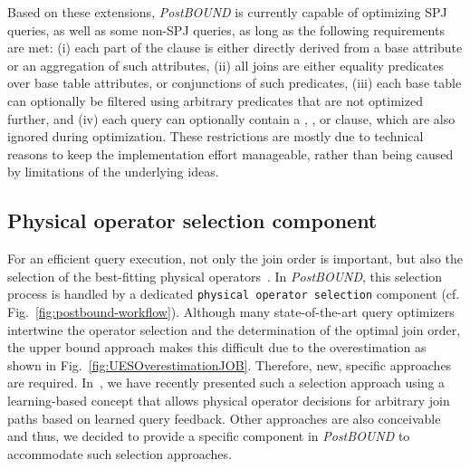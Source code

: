 Based on these extensions, \emph{PostBOUND} is currently capable of optimizing SPJ queries, as well as some non-SPJ queries, as long as the following requirements are met: (i) each part of the  clause is either directly derived from a base attribute or an aggregation of such attributes, (ii) all joins are either equality predicates over base table attributes, or conjunctions of such predicates, (iii) each base table can optionally be filtered using arbitrary predicates that are not optimized further, and (iv) each query can optionally contain a , , or  clause, which are also ignored during optimization. These restrictions are mostly due to technical reasons to keep the implementation effort manageable, rather than being caused by limitations of the underlying ideas.


\subsection{Physical operator selection component}
\label{sec:postbound-operator-selection}

For an efficient query execution, not only the join order is important, but also the selection of the best-fitting physical operators~\cite{DBLP:journals/pvldb/HertzschuchHHL22}. 
In \emph{PostBOUND}, this selection process is handled by a dedicated \texttt{physical operator selection} component (cf. Fig.~\ref{fig:postbound-workflow}). 
Although many state-of-the-art query optimizers intertwine the operator selection and the determination of the optimal join order, the upper bound approach makes this difficult due to the overestimation as shown in Fig.~\ref{fig:UESOverestimationJOB}. Therefore, new, specific approaches are required. 
In~\cite{DBLP:journals/pvldb/HertzschuchHHL22}, we have recently presented such a selection approach using a learning-based concept that allows physical operator decisions for arbitrary join paths based on learned query feedback.
Other approaches are also conceivable and thus, we decided to provide a specific component in \emph{PostBOUND} to accommodate such selection approaches. 

